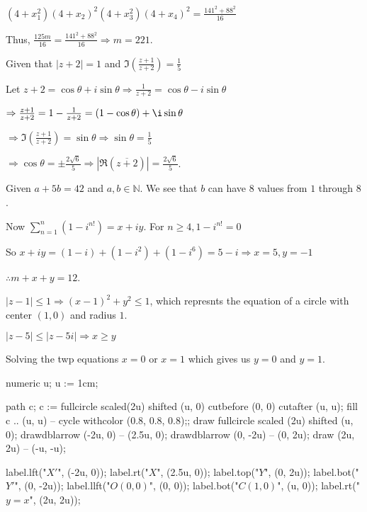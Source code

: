   $(4 + x_1^2)(4 + x_2)^2(4 + x_3^2)(4 + x_4)^2 = \frac{141^2 + 88^2}{16}$

  Thus, $\frac{125m}{16} = \frac{141^2 + 88^2}{16}\Rightarrow m = 221$.
\item Given that $|z + 2| = 1$ and $\Im\left(\frac{z + 1}{z + 2}\right)= \frac{1}{5}$

  Let $z + 2 = \cos\theta + i\sin\theta\Rightarrow \frac{1}{z + 2} = \cos\theta - i\sin\theta$

  $\Rightarrow \frac{z + 1}{z + 2} = 1 - \frac{1}{z + 2} = (1 - \cos\theta) + \i\sin\theta$

  $\Rightarrow \Im\left(\frac{z + 1}{z + 2}\right) = \sin\theta\Rightarrow \sin\theta = \frac{1}{5}$

  $\Rightarrow \cos\theta = \pm\frac{2\sqrt{6}}{5}\Rightarrow |\Re(\overline{z + 2})|
  = \frac{2\sqrt{6}}{5}$.
\item Given $a + 5b = 42$ and $a, b\in\mathbb{N}$. We see that $b$ can have $8$ values from $1$ through $8$.

  Now $\displaystyle\sum_{n = 1}^n\left(1 - i^{n!}\right) = x + iy$. For $n \geq 4, 1 - i^{n!} = 0$

  So $x + iy = (1- i) + \left(1 - i^2\right) + \left(1 - i^6\right) = 5 - i\Rightarrow x = 5, y = -1$

  $\therefore m + x + y = 12$.
\item $|z - 1|\leq 1\Rightarrow (x - 1)^2 + y^2\leq 1$, which represnts the equation of a circle with center
  $(1, 0)$ and radius $1$.

  $|z - 5|\leq |z - 5i|\Rightarrow x\geq y$

  Solving the twp equations $x = 0$ or $x = 1$ which gives us $y = 0$ and $y = 1$.

    \startplacefigure[location=force]
    \startMPcode
      numeric u;
      u := 1cm;

      path c;
      c := fullcircle scaled(2u) shifted (u, 0) cutbefore (0, 0) cutafter (u, u);
      fill c .. (u, u) -- cycle withcolor (0.8, 0.8, 0.8);;
      draw fullcircle scaled (2u) shifted (u, 0);
      drawdblarrow (-2u, 0) -- (2.5u, 0);
      drawdblarrow (0, -2u) -- (0, 2u);
      draw (2u, 2u) -- (-u, -u);

      label.lft("$X'$", (-2u, 0));
      label.rt("$X$", (2.5u, 0));
      label.top("$Y$", (0, 2u));
      label.bot("$Y'$", (0, -2u));
      label.llft("$O(0, 0)$", (0, 0));
      label.bot("$C(1, 0)$", (u, 0));
      label.rt("$y = x$", (2u, 2u));
    \stopMPcode
  \stopplacefigure

